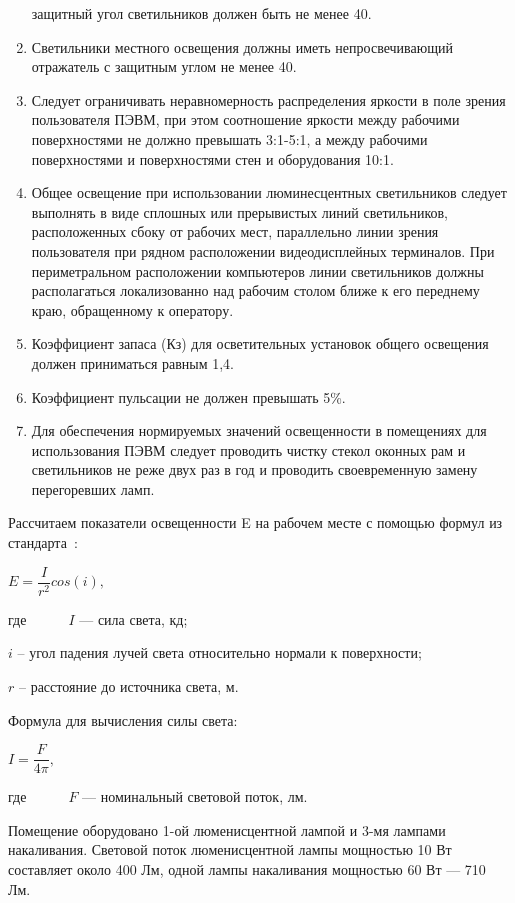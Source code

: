 \begin{enumerate}
 защитный угол светильников должен быть не менее 40\textdegree{}.
 \item Светильники местного освещения должны иметь непросвечивающий отражатель с защитным углом не менее 40\textdegree{}.
 \item Следует ограничивать неравномерность распределения яркости в поле зрения пользователя ПЭВМ, 
 при этом соотношение яркости между рабочими поверхностями не должно превышать 3:1-5:1, 
 а между рабочими поверхностями и поверхностями стен и оборудования 10:1.
 \item Общее освещение при использовании люминесцентных светильников следует 
 выполнять в виде сплошных или прерывистых линий светильников, расположенных сбоку от рабочих мест, 
 параллельно линии зрения пользователя при рядном расположении видеодисплейных терминалов. 
 При периметральном расположении компьютеров линии светильников должны располагаться локализованно 
 над рабочим столом ближе к его переднему краю, обращенному к оператору.
 \item Коэффициент запаса (Кз) для осветительных установок общего освещения должен приниматься равным 1,4.
 \item Коэффициент пульсации не должен превышать 5\%.
 \item Для обеспечения нормируемых значений освещенности в помещениях для использования 
 ПЭВМ следует проводить чистку стекол оконных рам и светильников не реже двух раз в год и 
 проводить своевременную замену перегоревших ламп.
\end{enumerate}


Рассчитаем показатели освещенности E на рабочем месте с помощью формул из стандарта~\cite{gost_8995}:
\begin{center}
$E = \dfrac{I}{r^{2}}cos(i),$
\end{center}
где~~~~~\ $\textit{I}$ --- сила света, кд;

$\textit{i}$ -- угол падения лучей света относительно нормали к поверхности;

$\textit{r}$ -- расстояние до источника света, м.

Формула для вычисления силы света:
\begin{center}
$I = \dfrac{F}{4\pi},$
\end{center}
где~~~~~\ $\textit{F}$ --- номинальный световой поток, лм.

Помещение оборудовано 1-ой люменисцентной лампой и 3-мя лампами накаливания.
Световой поток люменисцентной лампы мощностью 10 Вт составляет около 400 Лм, одной лампы
накаливания мощностью 60 Вт --- 710 Лм. 

